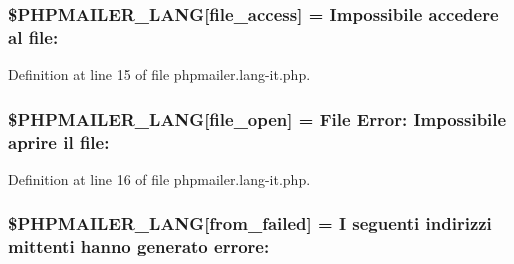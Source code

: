\subsubsection[{\texorpdfstring{\$\+P\+H\+P\+M\+A\+I\+L\+E\+R\+\_\+\+L\+A\+NG}{$PHPMAILER_LANG}}]{\setlength{\rightskip}{0pt plus 5cm}\$P\+H\+P\+M\+A\+I\+L\+E\+R\+\_\+\+L\+A\+NG\mbox{[}\textquotesingle{}file\+\_\+access\textquotesingle{}\mbox{]} = \textquotesingle{}Impossibile accedere al file\+: \textquotesingle{}}\hypertarget{phpmailer_8lang-it_8php_a7e83349023b856ef9e5c46e30ae6d51e}{}\label{phpmailer_8lang-it_8php_a7e83349023b856ef9e5c46e30ae6d51e}


Definition at line 15 of file phpmailer.\+lang-\/it.\+php.

\subsubsection[{\texorpdfstring{\$\+P\+H\+P\+M\+A\+I\+L\+E\+R\+\_\+\+L\+A\+NG}{$PHPMAILER_LANG}}]{\setlength{\rightskip}{0pt plus 5cm}\$P\+H\+P\+M\+A\+I\+L\+E\+R\+\_\+\+L\+A\+NG\mbox{[}\textquotesingle{}file\+\_\+open\textquotesingle{}\mbox{]} = \textquotesingle{}File Error\+: Impossibile aprire il file\+: \textquotesingle{}}\hypertarget{phpmailer_8lang-it_8php_a28d1a6517bf4c942a0ddd506188ad2e0}{}\label{phpmailer_8lang-it_8php_a28d1a6517bf4c942a0ddd506188ad2e0}


Definition at line 16 of file phpmailer.\+lang-\/it.\+php.

\subsubsection[{\texorpdfstring{\$\+P\+H\+P\+M\+A\+I\+L\+E\+R\+\_\+\+L\+A\+NG}{$PHPMAILER_LANG}}]{\setlength{\rightskip}{0pt plus 5cm}\$P\+H\+P\+M\+A\+I\+L\+E\+R\+\_\+\+L\+A\+NG\mbox{[}\textquotesingle{}from\+\_\+failed\textquotesingle{}\mbox{]} = \textquotesingle{}I seguenti indirizzi mittenti hanno generato errore\+: \textquotesingle{}}\hypertarget{phpmailer_8lang-it_8php_adf832ae12155a09be077c6d5e4fd7e22}{}\label{phpmailer_8lang-it_8php_adf832ae12155a09be077c6d5e4fd7e22}


